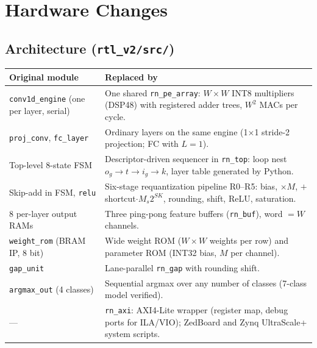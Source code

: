 \documentclass[10pt,a4paper]{article}
\begin{document}
\section{Hardware Changes}
\subsection{Architecture (\texttt{rtl\_v2/src/})}
\begin{tabularx}{\textwidth}{l L}
\toprule
\textbf{Original module} & \textbf{Replaced by} \\
\midrule
\texttt{conv1d\_engine} (one per layer, serial) & One shared \texttt{rn\_pe\_array}: $W{\times}W$ INT8 multipliers (DSP48) with registered adder trees, $W^2$ MACs per cycle. \\
\texttt{proj\_conv}, \texttt{fc\_layer} & Ordinary layers on the same engine (1$\times$1 stride-2 projection; FC with $L{=}1$). \\
Top-level 8-state FSM & Descriptor-driven sequencer in \texttt{rn\_top}: loop nest $o_g \rightarrow t \rightarrow i_g \rightarrow k$, layer table generated by Python. \\
Skip-add in FSM, \texttt{relu} & Six-stage requantization pipeline R0--R5: bias, $\times M$, $+$ shortcut$\cdot M_s 2^{SK}$, rounding, shift, ReLU, saturation. \\
8 per-layer output RAMs & Three ping-pong feature buffers (\texttt{rn\_buf}), word $=W$ channels. \\
\texttt{weight\_rom} (BRAM IP, 8 bit) & Wide weight ROM ($W{\times}W$ weights per row) and parameter ROM (INT32 bias, $M$ per channel). \\
\texttt{gap\_unit} & Lane-parallel \texttt{rn\_gap} with rounding shift. \\
\texttt{argmax\_out} (4 classes) & Sequential argmax over any number of classes (7-class model verified). \\
--- & \texttt{rn\_axi}: AXI4-Lite wrapper (register map, debug ports for ILA/VIO); ZedBoard and Zynq UltraScale+ system scripts. \\
\bottomrule
\end{tabularx}
\end{document}

